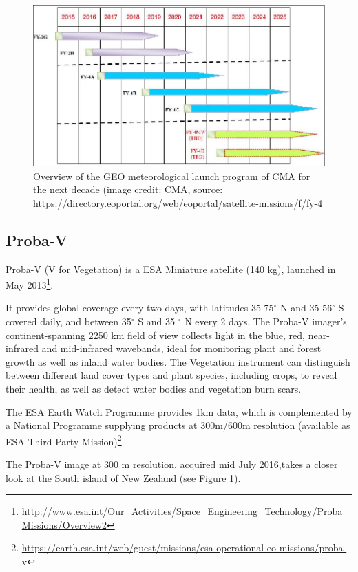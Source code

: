 \documentclass{article}
\def\deg{$^\circ$\xspace}
\begin{document}
\begin{figure}[h!]    
\centering
\label{fig:nz_probaV}
\includegraphics[width=\linewidth]{figures/FY4_Auto4.jpeg}
\caption{
Overview of the GEO meteorological launch program of CMA for the next decade (image credit: CMA, source: \url{https://directory.eoportal.org/web/eoportal/satellite-missions/f/fy-4}}
\end{figure}




\subsection{Proba-V}
\label{probaV}
Proba-V (V for Vegetation) is a ESA Miniature satellite (140 kg), launched in May 2013\footnote{\url{http://www.esa.int/Our_Activities/Space_Engineering_Technology/Proba_Missions/Overview2}}. 

It provides global coverage every two days, with latitudes 35-75\deg N and 35-56\deg S covered daily, and between 35\deg S and 35 \deg N  every 2 days. 
The Proba-V imager's continent-spanning 2250 km field of view collects light in the blue, red, near-infrared and mid-infrared wavebands, ideal for monitoring plant and forest growth as well as inland water bodies. The Vegetation instrument can distinguish between different land cover types and plant species, including crops, to reveal their health, as well as detect water bodies and vegetation burn scars.

The ESA Earth Watch Programme provides 1km data, which is complemented by a National Programme supplying products at 300m/600m resolution (available as ESA Third Party Mission)\footnote{\url{https://earth.esa.int/web/guest/missions/esa-operational-eo-missions/proba-v}}

The Proba-V image at 300 m resolution, acquired mid July 2016,takes a closer look at the South island of New Zealand (see Figure \ref{fig:nz_probaV}).
\end{document}
